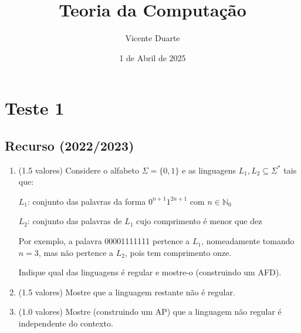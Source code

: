 \documentclass[a4paper,12pt]{article}
\author{Vicente Duarte}
\begin{document}
\title{Teoria da Computação}
\date{1 de Abril de 2025}
\maketitle

\section*{Teste 1}

\subsection*{Recurso (2022/2023)}

\begin{enumerate}[label=\alph*)]
  \item (1.5 valores) Considere o alfabeto \(\Sigma = \{0, 1\}\) e as linguagens \(L_1, L_2 \subseteq \Sigma^*\) tais que:
  
  \hspace{1cm}\parbox{\textwidth}{\(L_1\): conjunto das palavras da forma \(0^{n+1}1^{2n+1}\) com \(n \in \mathbb{N}_0\)}

  \hspace{1cm}\parbox{\textwidth}{\(L_2\): conjunto das palavras de \(L_1\) cujo comprimento é menor que dez}
  
  Por exemplo, a palavra 00001111111 pertence a \(L_1\), nomeadamente tomando \(n = 3\), mas não pertence a \(L_2\), pois tem comprimento onze.
  
  Indique qual das linguagens é regular e mostre-o (construindo um AFD).

  \item (1.5 valores) Mostre que a linguagem restante não é regular.

  \item (1.0 valores) Mostre (construindo um AP) que a linguagem não regular é independente do contexto.
\end{enumerate}
\end{document}
